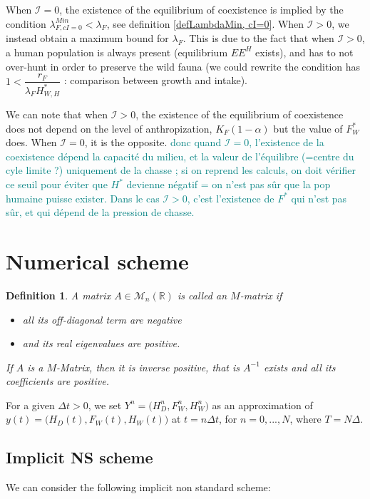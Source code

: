 \documentclass{article}
\newcommand{\lfw}{\lambda_{F}}
\newcommand{\lfw}{\lambda_{F}}
\newcommand{\cI}{\mathcal{I}}
\newcommand{\marc}[1]{\textcolor{teal}{#1}}
\newtheorem{definition}{Definition}
\begin{document}
When $\cI = 0$, the existence of the equilibrium of coexistence is implied by the condition $\lambda_{F, cI = 0}^{Min} < \lfw$, see definition \ref{defLambdaMin, cI=0}. When $\cI > 0$, we instead obtain a maximum bound for $\lfw$. This is due to the fact that when $\cI > 0$, a human population is always present (equilibrium $EE^{H}$ exists), and has to not over-hunt in order to preserve the wild fauna (we could rewrite the condition has $1 < \dfrac{r_F}{\lfw H^*_{W, H}}$ : comparison between growth and intake).


We can note that when $\cI > 0$, the existence of the equilibrium of coexistence does not depend on the level of anthropization, $K_F(1-\alpha)$ but the value of $F^*_W$ does. When $\cI = 0$, it is the opposite. 
\marc{donc quand $\cI =0$, l'existence de la coexistence dépend la capacité du milieu, et la valeur de l'équilibre (=centre du cyle limite ?) uniquement de la chasse ; si on reprend les calculs, on doit vérifier ce seuil pour éviter que $H^*$ devienne négatif = on n'est pas sûr que la pop humaine puisse exister. Dans le cas $\cI > 0$, c'est l'existence de $F^*$ qui n'est pas sûr, et qui dépend de la pression de chasse.}

\section{Numerical scheme }
\begin{definition} A matrix $A \in \mathcal{M}_n (\mathbb{R})$ is called an $M$-matrix if\begin{itemize}
\item all its off-diagonal term are negative
\item and its real eigenvalues are positive.
\end{itemize}

If $A$ is a $M$-Matrix, then it is inverse positive, that is $A^{-1}$ exists and all its coefficients are positive.


\end{definition}


For a given $\Delta t>0$, we set $Y^n=\Big(H_D^n,F_W^n,H_W^n \Big)$ as an approximation of $y(t)=\Big(H_D(t),F_W(t),H_W(t)\Big)$ at $t=n\Delta t$, for $n=0,...,N$, where $T=N\Delta$.


\subsection{Implicit NS scheme}
We can consider the following implicit non standard scheme:
\end{document}
